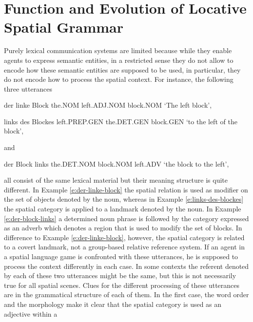 %

\chapter{Function and Evolution of Locative Spatial Grammar}
\label{s:grammar}
Purely lexical communication systems are limited
because while they enable agents to express semantic entities, in a restricted sense 
they do not allow to encode how these semantic entities are supposed to be used,
in particular, they do not encode how to process the spatial context.
For instance, the following three utterances 

\begin{example}
\label{e:der-linke-block}
\gll der linke Block 
the.NOM left.ADJ.NOM block.NOM 
\glt `The left block',
\glend
\end{example}
\begin{example}
\label{e:links-des-blockes}
\gll links des Blockes
left.PREP.GEN the.DET.GEN block.GEN 
\glt `to the left of the block',
\glend
\end{example}
and
\begin{example}
\label{e:der-block-links}
\gll der Block links
the.DET.NOM block.NOM left.ADV
\glt `the block to the left',
\glend
\end{example}
all consist of the same lexical material but their meaning structure is quite different.
In Example \ref{e:der-linke-block} the spatial relation is used as modifier on the set of
objects denoted by the noun, whereas in Example \ref{e:links-des-blockes} the
spatial category is applied to a landmark denoted by the noun. In Example \ref{e:der-block-links}
a determined noun phrase is followed by the category expressed as an adverb which
denotes a region that is used to modify the set of blocks. In difference to Example \ref{e:der-linke-block}, 
however, the spatial category is related to a covert landmark, not a 
group-based relative reference system.
If an agent in a spatial language game is confronted with these utterances, he is supposed to 
process the context differently in each case. In some contexts the referent
denoted by each of these two utterances might be the same, but this is not necessarily
true for all spatial scenes. Clues for the different processing of these
utterances are in the grammatical structure of each of them. In the first case, 
the word order and the
morphology make it clear that the spatial category is used as an adjective within a
